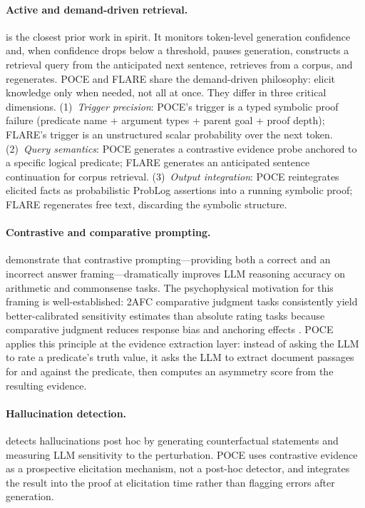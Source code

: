 \documentclass[11pt,letterpaper]{article}
\begin{document}
\paragraph{Active and demand-driven retrieval.}
\citet{Jiang2023} is the closest prior work in spirit. It monitors token-level generation
confidence and, when confidence drops below a threshold, pauses generation, constructs a retrieval query from the anticipated
next sentence, retrieves from a corpus, and regenerates. POCE and FLARE share the demand-driven philosophy: elicit knowledge
only when needed, not all at once. They differ in three critical dimensions. (1)~\emph{Trigger precision}: POCE's trigger is
a typed symbolic proof failure (predicate name + argument types + parent goal + proof depth); FLARE's trigger is an unstructured
scalar probability over the next token. (2)~\emph{Query semantics}: POCE generates a contrastive evidence probe anchored to
a specific logical predicate; FLARE generates an anticipated sentence continuation for corpus retrieval. (3)~\emph{Output integration}:
POCE reintegrates elicited facts as probabilistic ProbLog assertions into a running symbolic proof; FLARE regenerates
free text, discarding the symbolic structure.

\paragraph{Contrastive and comparative prompting.}
\citet{Lyu2024} demonstrate that contrastive prompting---providing both a correct and an incorrect answer framing---dramatically improves LLM reasoning
accuracy on arithmetic and commonsense tasks. The psychophysical motivation for this framing is well-established: 2AFC
comparative judgment tasks consistently yield better-calibrated sensitivity estimates than absolute rating tasks because
comparative judgment reduces response bias and anchoring effects \citep{Green1966}. POCE applies this principle at the evidence extraction
layer: instead of asking the LLM to rate a predicate's truth value, it asks the LLM to extract document passages for and
against the predicate, then computes an asymmetry score from the resulting evidence.

\paragraph{Hallucination detection.}
\citet{Feng2025} detects hallucinations post hoc by generating counterfactual statements and measuring LLM sensitivity to
the perturbation. POCE uses contrastive evidence as a prospective elicitation mechanism, not a post-hoc detector, and
integrates the result into the proof at elicitation time rather than flagging errors after generation.
\end{document}
